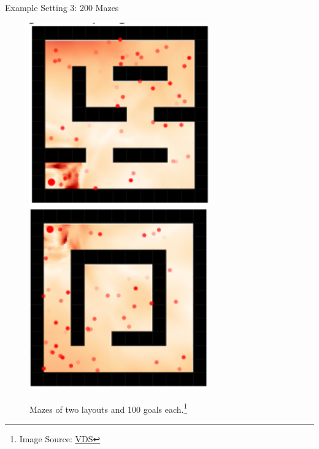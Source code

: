\documentclass[aspectratio=169]{../latex_main/tntbeamer}  %
\begin{document}
\begin{frame}[c]{Example Setting 3: 200 Mazes}

\begin{figure}
\centering
\includegraphics[scale=1]{images/maze}
\includegraphics[scale=1]{images/maze2}
\caption{Mazes of two layouts and 100 goals each.\footnote{Image Source: \href{https://arxiv.org/pdf/2006.09641.pdf}{VDS}}}
\end{figure}
	
\end{frame}
\end{document}
